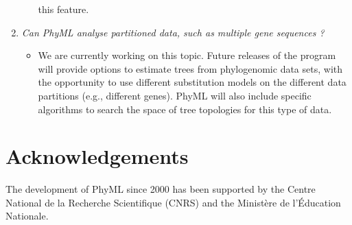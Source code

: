 \documentclass[a4paper,12pt]{article}
\begin{document}
\begin{enumerate}
\begin{itemize}
this feature.
\end{itemize}
\item {\it Can PhyML analyse partitioned data, such as multiple gene sequences ?}\\
\begin{itemize}
\item We are currently  working on this topic.  Future releases of  the program will provide options
to estimate  trees from phylogenomic data sets,  with the opportunity to  use different substitution
models on  the different data partitions (e.g.,  different genes). PhyML will  also include specific
algorithms to search the space of tree topologies for this type of data.
\end{itemize}
\end{enumerate}



\section{Acknowledgements}  
The development of PhyML since 2000 has been supported by the Centre National de la Recherche
Scientifique (CNRS) and the Minist\`ere de l'\'Education Nationale.

% 



\printindex
\end{document}
